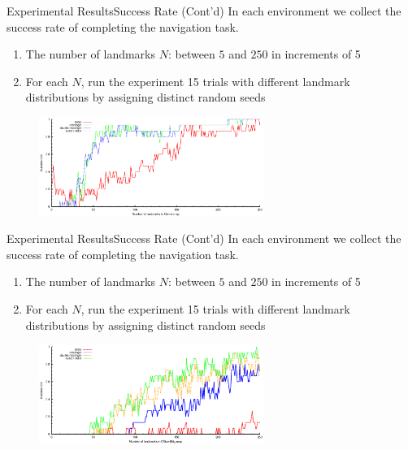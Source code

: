 \documentclass[10pt]{beamer}
\begin{document}
\begin{frame}{Experimental Results}{Success Rate (Cont'd)}
In each environment we collect the success rate of completing the navigation
task. 
\begin{enumerate}
\item The number of landmarks $N$: between $5$ and $250$ in increments of 5
\item For each $N$, run the experiment 15 trials with different landmark
  distributions by assigning distinct random seeds
\end{enumerate}
\begin{figure}
  \begin{center}
    \includegraphics[width=0.65\textwidth]{figs/exp_num_clutter}
  \end{center}
  \label{fig:sucRate1}
\end{figure}
\end{frame}

\begin{frame}{Experimental Results}{Success Rate (Cont'd)}
In each environment we collect the success rate of completing the navigation
task. 
\begin{enumerate}
\item The number of landmarks $N$: between $5$ and $250$ in increments of 5
\item For each $N$, run the experiment 15 trials with different landmark
  distributions by assigning distinct random seeds
\end{enumerate}
\begin{figure}
  \begin{center}
    \includegraphics[width=0.65\textwidth]{figs/exp_num_cse}
  \end{center}
  \label{fig:sucRate1}
\end{figure}
\end{frame}
\end{document}

